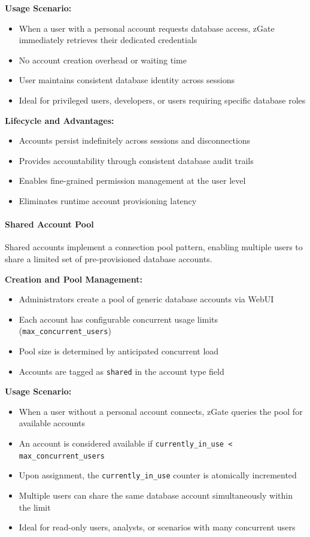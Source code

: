 \textbf{Usage Scenario:}
\begin{itemize}[leftmargin=*]
    \item When a user with a personal account requests database access, zGate immediately retrieves their dedicated credentials
    \item No account creation overhead or waiting time
    \item User maintains consistent database identity across sessions
    \item Ideal for privileged users, developers, or users requiring specific database roles
\end{itemize}

\textbf{Lifecycle and Advantages:}
\begin{itemize}[leftmargin=*]
    \item Accounts persist indefinitely across sessions and disconnections
    \item Provides accountability through consistent database audit trails
    \item Enables fine-grained permission management at the user level
    \item Eliminates runtime account provisioning latency
\end{itemize}

\paragraph{Shared Account Pool}

Shared accounts implement a connection pool pattern, enabling multiple users to share a limited set of pre-provisioned database accounts.

\textbf{Creation and Pool Management:}
\begin{itemize}[leftmargin=*]
    \item Administrators create a pool of generic database accounts via WebUI
    \item Each account has configurable concurrent usage limits (\texttt{max\_concurrent\_users})
    \item Pool size is determined by anticipated concurrent load
    \item Accounts are tagged as \texttt{shared} in the account type field
\end{itemize}

\textbf{Usage Scenario:}
\begin{itemize}[leftmargin=*]
    \item When a user without a personal account connects, zGate queries the pool for available accounts
    \item An account is considered available if \texttt{currently\_in\_use < max\_concurrent\_users}
    \item Upon assignment, the \texttt{currently\_in\_use} counter is atomically incremented
    \item Multiple users can share the same database account simultaneously within the limit
    \item Ideal for read-only users, analysts, or scenarios with many concurrent users
\end{itemize}

